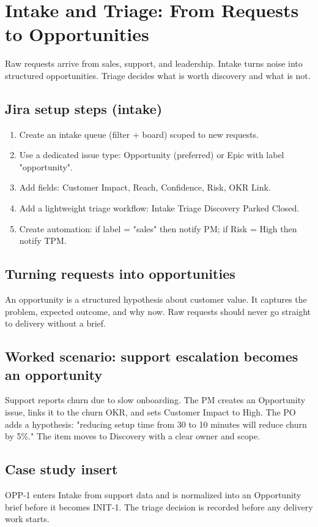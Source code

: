 \section{Intake and Triage: From Requests to Opportunities}
Raw requests arrive from sales, support, and leadership. Intake turns noise into structured opportunities. Triage decides what is worth discovery and what is not.

\subsection{Jira setup steps (intake)}
\begin{enumerate}
  \item Create an intake queue (filter + board) scoped to new requests.
  \item Use a dedicated issue type: Opportunity (preferred) or Epic with label "opportunity".
  \item Add fields: Customer Impact, Reach, Confidence, Risk, OKR Link.
  \item Add a lightweight triage workflow: Intake \textrightarrow{} Triage \textrightarrow{} Discovery \textrightarrow{} Parked \textrightarrow{} Closed.
  \item Create automation: if label = "sales" then notify PM; if Risk = High then notify TPM.
\end{enumerate}

\subsection{Turning requests into opportunities}
An opportunity is a structured hypothesis about customer value. It captures the problem, expected outcome, and why now. Raw requests should never go straight to delivery without a brief.

\subsection{Worked scenario: support escalation becomes an opportunity}
Support reports churn due to slow onboarding. The PM creates an Opportunity issue, links it to the churn OKR, and sets Customer Impact to High. The PO adds a hypothesis: "reducing setup time from 30 to 10 minutes will reduce churn by 5\%." The item moves to Discovery with a clear owner and scope.

\subsection{Case study insert}
OPP-1 enters Intake from support data and is normalized into an Opportunity brief before it becomes INIT-1. The triage decision is recorded before any delivery work starts.
